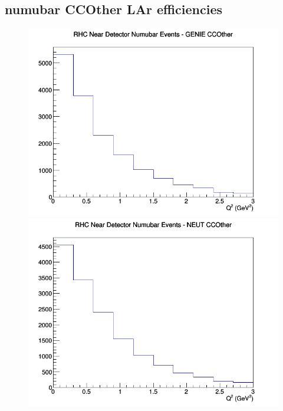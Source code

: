 \documentclass[12pt]{article}
\begin{document}
\subsection{numubar CCOther LAr efficiencies}
\begin{figure}[h]
\includegraphics[width=\linewidth]{eff_Q2/LAr/CCOther_RHC_ND_numubar_Q2_GENIE.png}
\endminipage
{}
\includegraphics[width=\linewidth]{eff_Q2/LAr/CCOther_RHC_ND_numubar_Q2_NEUT.png}
\endminipage
{}

\end{figure}
\end{document}
